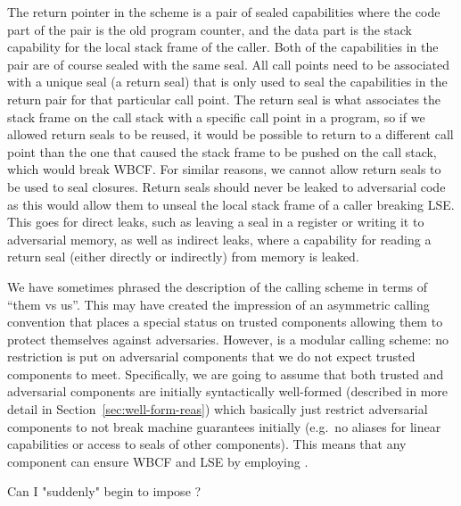 \documentclass[acmsmall,review,showframe]{acmart}\settopmatter{printfolios=true,printccs=false,printacmref=false}
\begin{document}
The return pointer in the \stktokens{} scheme is a pair of sealed capabilities where the code part of the pair is the old program counter, and the data part is the stack capability for the local stack frame of the caller.
Both of the capabilities in the pair are of course sealed with the same seal.
All call points need to be associated with a unique seal (a return seal) that is only used to seal the capabilities in the return pair for that particular call point.
The return seal is what associates the stack frame on the call stack with a specific call point in a program, so if we allowed return seals to be reused, it would be possible to return to a different call point than the one that caused the stack frame to be pushed on the call stack, which would break WBCF.
For similar reasons, we cannot allow return seals to be used to seal closures.
Return seals should never be leaked to adversarial code as this would allow them to unseal the local stack frame of a caller breaking LSE.
This goes for direct leaks, such as leaving a seal in a register or writing it to adversarial memory, as well as indirect leaks, where a capability for reading a return seal (either directly or indirectly) from memory is leaked.

We have sometimes phrased the description of the \stktokens{} calling scheme in terms of ``them vs us''.
This may have created the impression of an asymmetric calling convention that places a special status on trusted components allowing them to protect themselves against adversaries.
However, \stktokens{} is a modular calling scheme: no restriction is put on adversarial components that we do not expect trusted components to meet.
Specifically, we are going to assume that both trusted and adversarial components are initially syntactically well-formed (described in more detail in Section~\ref{sec:well-form-reas}) which basically just restrict adversarial components to not break machine guarantees initially (e.g.\ no aliases for linear capabilities or access to seals of other components).
This means that any component can ensure WBCF and LSE by employing \stktokens{}.

Can I "suddenly" begin to impose \stktokens{}?
\end{document}

